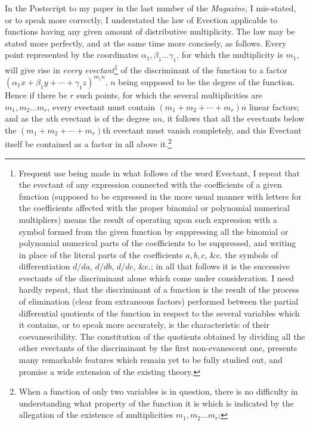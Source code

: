 \documentclass[11pt]{article}
\newcommand{\sourcepage}[1]{\marginpar{\scriptsize p.~#1}}
\begin{document}
{{\sourcepage{370}
In the Postscript to my paper in the last number of the \emph{Magazine}, I mis-stated, or to speak more correctly, I understated the law of Evection applicable to functions having any given amount of distributive multiplicity. The law may be stated more perfectly, and at the same time more concisely, as follows. Every point represented by the coordinates $\alpha_1,\beta_1\ldots\gamma_1$, for which the multiplicity is $m_1$, will give rise in \emph{every evectant}\footnote{Frequent use being made in what follows of the word Evectant, I repeat that the evectant of any expression connected with the coefficients of a given function (supposed to be expressed in the more usual manner with letters for the coefficients affected with the proper binomial or polynomial numerical multipliers) means the result of operating upon such expression with a symbol formed from the given function by suppressing all the binomial or polynomial numerical parts of the coefficients to be suppressed, and writing in place of the literal parts of the coefficients $a,b,c$, \&c. the symbols of differentiation $d/da$, $d/db$, $d/dc$, \&c.; in all that follows it is the successive evectants of the discriminant alone which come under consideration. I need hardly repeat, that the discriminant of a function is the result of the process of elimination (clear from extraneous factors) performed between the partial differential quotients of the function in respect to the several variables which it contains, or to speak more accurately, is the characteristic of their coevanescibility. The constitution of the quotients obtained by dividing all the other evectants of the discriminant by the first non-evanescent one, presents many remarkable features which remain yet to be fully studied out, and promise a wide extension of the existing theory.} of the discriminant of the function to a factor $(\alpha_1x+\beta_1y+\cdots+\gamma_1z)^{m_1n}$, $n$ being supposed to be the degree of the function. Hence if there be $r$ such points, for which the several multiplicities are $m_1,m_2\ldots m_r$, every evectant must contain $(m_1+m_2+\cdots+m_r)n$ linear factors; and as the $u$th evectant is of the degree $un$, it follows that all the evectants below the $(m_1+m_2+\cdots+m_r)$th evectant must vanish completely, and this Evectant itself be contained as a factor in all above it.\footnote{When a function of only two variables is in question, there is no difficulty in understanding what property of the function it is which is indicated by the allegation of the existence of multiplicities $m_1,m_2\ldots m_r$;}

}}
\end{document}
